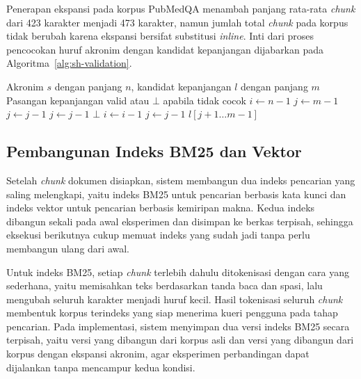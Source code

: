 Penerapan ekspansi pada korpus PubMedQA menambah panjang rata-rata \textit{chunk} dari 423 karakter menjadi 473 karakter, namun jumlah total \textit{chunk} pada korpus tidak berubah karena ekspansi bersifat substitusi \textit{inline}. Inti dari proses pencocokan huruf akronim dengan kandidat kepanjangan dijabarkan pada Algoritma~\ref{alg:sh-validation}.

\begin{algorithm}[H]
\caption{Validasi Pasangan Akronim-Kepanjangan dengan Schwartz-Hearst}
\label{alg:sh-validation}
\begin{algorithmic}[1]
\Require Akronim $s$ dengan panjang $n$, kandidat kepanjangan $l$ dengan panjang $m$
\Ensure Pasangan kepanjangan valid atau $\bot$ apabila tidak cocok
\State $i \gets n - 1$ 
\State $j \gets m - 1$ 
   
      \State $j \gets j - 1$
    \EndWhile
  \Else {}
      \State $j \gets j - 1$
    \EndWhile
  \EndIf
   \Return $\bot$ \EndIf
  \State $i \gets i - 1$
  \State $j \gets j - 1$
\EndWhile
\State \Return $l[j+1 \ldots m-1]$ 
\end{algorithmic}
\end{algorithm}

\subsection{Pembangunan Indeks BM25 dan Vektor}
\label{subsec:impl-build-index}

Setelah \textit{chunk} dokumen disiapkan, sistem membangun dua indeks pencarian yang saling melengkapi, yaitu indeks BM25 untuk pencarian berbasis kata kunci dan indeks vektor untuk pencarian berbasis kemiripan makna. Kedua indeks dibangun sekali pada awal eksperimen dan disimpan ke berkas terpisah, sehingga eksekusi berikutnya cukup memuat indeks yang sudah jadi tanpa perlu membangun ulang dari awal.

Untuk indeks BM25, setiap \textit{chunk} terlebih dahulu ditokenisasi dengan cara yang sederhana, yaitu memisahkan teks berdasarkan tanda baca dan spasi, lalu mengubah seluruh karakter menjadi huruf kecil. Hasil tokenisasi seluruh \textit{chunk} membentuk korpus terindeks yang siap menerima kueri pengguna pada tahap pencarian. Pada implementasi, sistem menyimpan dua versi indeks BM25 secara terpisah, yaitu versi yang dibangun dari korpus asli dan versi yang dibangun dari korpus dengan ekspansi akronim, agar eksperimen perbandingan dapat dijalankan tanpa mencampur kedua kondisi.

